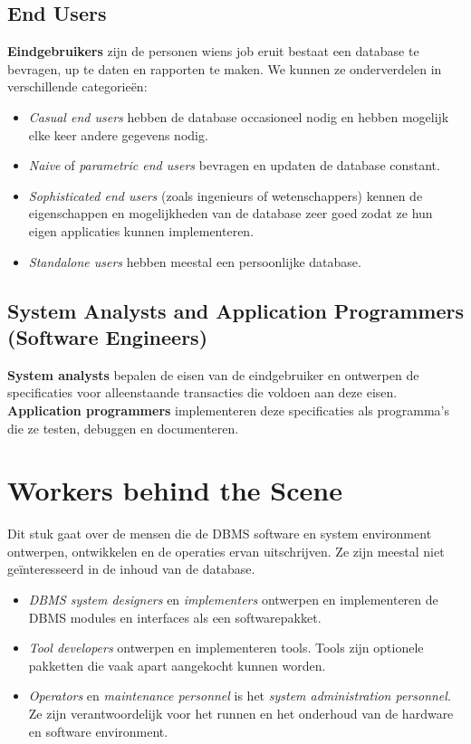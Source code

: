\subsection{End Users}
\textbf{Eindgebruikers} zijn de personen wiens job eruit bestaat een database te bevragen, up te daten en rapporten te maken. We kunnen ze onderverdelen in verschillende categorie\"en:
\begin{itemize}
\item \textit{Casual end users} hebben de database occasioneel nodig en hebben mogelijk elke keer andere gegevens nodig.
\item \textit{Naive} of \textit{parametric end users} bevragen en updaten de database constant.
\item \textit{Sophisticated end users} (zoals ingenieurs of wetenschappers) kennen de eigenschappen en mogelijkheden van de database zeer goed zodat ze hun eigen applicaties kunnen implementeren.
\item \textit{Standalone users} hebben meestal een persoonlijke database.
\end{itemize}

\subsection{System Analysts and Application Programmers (Software Engineers)}
\textbf{System analysts} bepalen de eisen van de eindgebruiker en ontwerpen de specificaties voor alleenstaande transacties die voldoen aan deze eisen. \textbf{Application programmers} implementeren deze specificaties als programma's die ze testen, debuggen en documenteren.


\section{Workers behind the Scene}
Dit stuk gaat over de mensen die de DBMS software en system environment ontwerpen, ontwikkelen en de operaties ervan uitschrijven. Ze zijn meestal niet ge\"interesseerd in de inhoud van de database.
\begin{itemize}
\item \textit{DBMS system designers} en \textit{implementers} ontwerpen en implementeren de DBMS modules en interfaces als een softwarepakket.
\item \textit{Tool developers} ontwerpen en implementeren tools. Tools zijn optionele pakketten die vaak apart aangekocht kunnen worden.
\item \textit{Operators} en \textit{maintenance personnel} is het \textit{system administration personnel}. Ze zijn verantwoordelijk voor het runnen en het onderhoud van de hardware en software environment.
\end{itemize}


